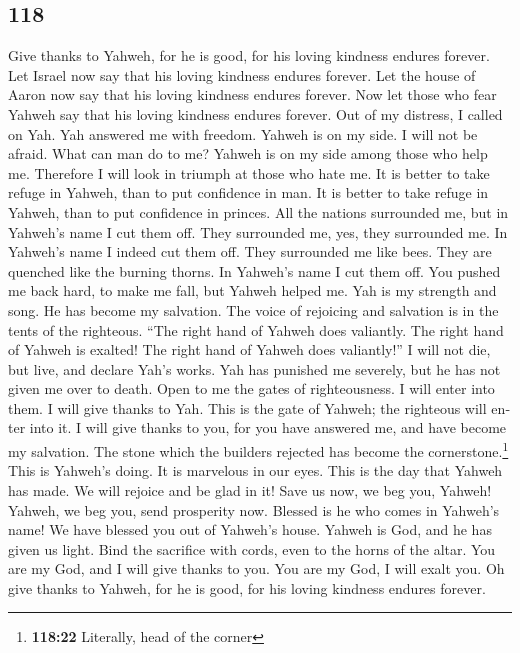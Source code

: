 \begin{paracol}{2}
\switchcolumn
\begin{otherlanguage}{english}

\hypertarget{section-235}{%
\section{118}\label{section-235}}

 Give thanks to Yahweh, for he is good, for his loving
kindness endures forever.  Let Israel now say that his
loving kindness endures forever.  Let the house of Aaron
now say that his loving kindness endures forever.  Now let
those who fear Yahweh say that his loving kindness endures forever.
 Out of my distress, I called on Yah. Yah answered me with
freedom.  Yahweh is on my side. I will not be afraid. What
can man do to me?  Yahweh is on my side among those who
help me. Therefore I will look in triumph at those who hate me.
 It is better to take refuge in Yahweh, than to put
confidence in man.  It is better to take refuge in Yahweh,
than to put confidence in princes.  All the nations
surrounded me, but in Yahweh's name I cut them off.  They
surrounded me, yes, they surrounded me. In Yahweh's name I indeed cut
them off.  They surrounded me like bees. They are
quenched like the burning thorns. In Yahweh's name I cut them off.
 You pushed me back hard, to make me fall, but Yahweh
helped me.  Yah is my strength and song. He has become my
salvation.  The voice of rejoicing and salvation is in
the tents of the righteous. ``The right hand of Yahweh does valiantly.
 The right hand of Yahweh is exalted! The right hand of
Yahweh does valiantly!''  I will not die, but live, and
declare Yah's works.  Yah has punished me severely, but
he has not given me over to death.  Open to me the gates
of righteousness. I will enter into them. I will give thanks to Yah.
 This is the gate of Yahweh; the righteous will enter
into it.  I will give thanks to you, for you have
answered me, and have become my salvation.  The stone
which the builders rejected has become the cornerstone.\footnote{\textbf{118:22}
  Literally, head of the corner}  This is Yahweh's doing.
It is marvelous in our eyes.  This is the day that Yahweh
has made. We will rejoice and be glad in it!  Save us
now, we beg you, Yahweh! Yahweh, we beg you, send prosperity now.
 Blessed is he who comes in Yahweh's name! We have
blessed you out of Yahweh's house.  Yahweh is God, and he
has given us light. Bind the sacrifice with cords, even to the horns of
the altar.  You are my God, and I will give thanks to
you. You are my God, I will exalt you.  Oh give thanks to
Yahweh, for he is good, for his loving kindness endures forever.


\end{otherlanguage}
\end{paracol}
